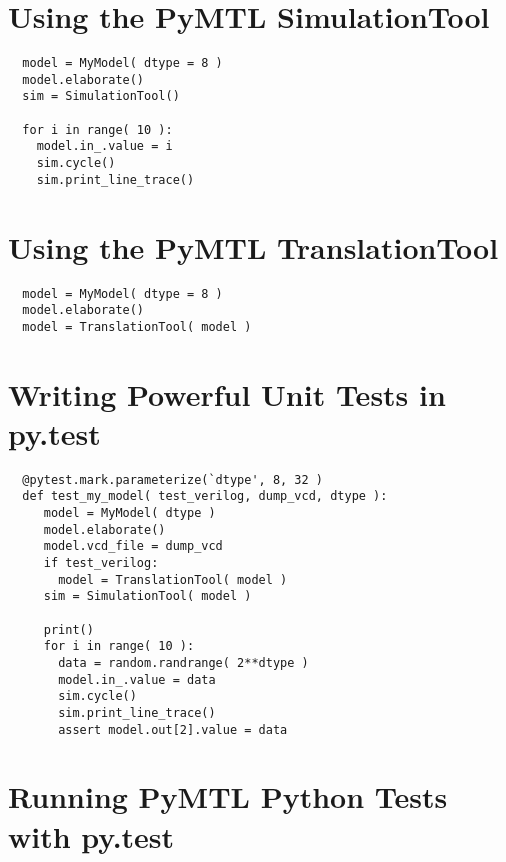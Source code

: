 \documentclass{cbxdoc}
\begin{document}
\section{Using the PyMTL SimulationTool}
\begin{verbatim}
  model = MyModel( dtype = 8 ) 
  model.elaborate()
  sim = SimulationTool()

  for i in range( 10 ):
    model.in_.value = i
    sim.cycle()
    sim.print_line_trace()
\end{verbatim}

\section{Using the PyMTL TranslationTool}
\begin{verbatim}
  model = MyModel( dtype = 8 ) 
  model.elaborate()
  model = TranslationTool( model )
\end{verbatim}

\section{Writing Powerful Unit Tests in py.test}
\begin{verbatim}
  @pytest.mark.parameterize(`dtype', 8, 32 )
  def test_my_model( test_verilog, dump_vcd, dtype ):
     model = MyModel( dtype )
     model.elaborate()
     model.vcd_file = dump_vcd
     if test_verilog:
       model = TranslationTool( model )
     sim = SimulationTool( model )

     print()
     for i in range( 10 ):
       data = random.randrange( 2**dtype )
       model.in_.value = data
       sim.cycle()
       sim.print_line_trace()
       assert model.out[2].value = data
\end{verbatim}


\section{Running PyMTL Python Tests with py.test}
\end{document}
